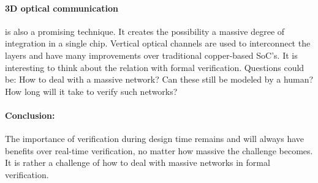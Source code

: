 \paragraph{3D optical communication}is also a promising technique. It creates the
possibility a massive degree of integration in a single chip. Vertical optical
channels are used to interconnect the layers and have many improvements over
traditional copper-based SoC's. It is interesting to think about the relation
with formal verification. Questions could be: How to deal with a massive
network? Can these still be modeled by a human? How long will it take to verify
such networks? \cite{4542033,5306588}

\paragraph{Conclusion: }The importance of verification during design time remains and will
always have benefits over real-time verification, no matter how massive the
challenge becomes. It is rather a challenge of how to deal with massive networks in
formal verification.


\newpage

